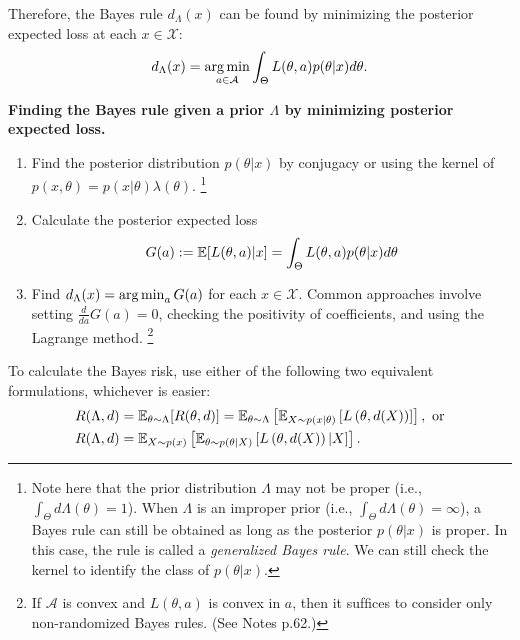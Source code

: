 Therefore, the Bayes rule $d_\Lambda(x)$ can be found by minimizing the posterior expected loss at each $x \in \mathcal{X}$:
\[
d_\Lambda(x) = \operatorname*{arg\,min}_{a \in \mathcal{A}} \int_\Theta L(\theta, a) p(\theta|x) d\theta.
\]

\begin{mybox}
    \textbf{Finding the Bayes rule given a prior $\Lambda$ by minimizing posterior expected loss.}
    \begin{enumerate}[leftmargin=36pt]
        \item[Step 1:] Find the posterior distribution $p(\theta|x)$ by conjugacy or using the kernel of $p(x,\theta) = p(x|\theta)\lambda(\theta)$.
        \footnote{Note here that the prior distribution $\Lambda$ may not be proper (i.e., $\int_\Theta d\Lambda(\theta)=1$). When $\Lambda$ is an improper prior (i.e., $\int_\Theta d\Lambda(\theta)=\infty$), a Bayes rule can still be obtained as long as the posterior $p(\theta|x)$ is proper. In this case, the rule is called a \emph{generalized Bayes rule}. We can still check the kernel to identify the class of $p(\theta|x)$.}
        \item[Step 2:] Calculate the posterior expected loss 
        \[
        G(a) :=\mathbb{E}[L(\theta, a)|x] = \int_\Theta L(\theta, a) p(\theta|x) d\theta
        \]
        \item[Step 3:] Find $d_\Lambda(x) = \operatorname*{arg\,min}_{a} G(a)$ for each $x \in \mathcal{X}$. Common approaches involve setting $\frac{d}{da} G(a) = 0$, checking the positivity of coefficients, and using the Lagrange method.
        \footnote{
            If $\mathcal A$ is convex and $L(\theta,a)$ is convex in $a$, then it sufﬁces to consider only non-randomized Bayes rules. (See Notes p.62.)
        }
    \end{enumerate}

    To calculate the Bayes risk, use either of the following two equivalent formulations, whichever is easier:
    \begin{align*}
        R(\Lambda,d)
        &= \mathbb{E}_{\theta\sim\Lambda}[R(\theta,d)]
        = \mathbb{E}_{\theta\sim\Lambda}\left[
        \mathbb{E}_{X\sim p(x | \theta)}
        \left[L\left(\theta,d(X)\right)\right]
        \right],\ \text{or}\\
        R(\Lambda,d)
        &= \mathbb{E}_{X\sim p(x)}\left[
        \mathbb{E}_{\theta\sim p(\theta | X)}
        \left[L\left(\theta,d(X)\right) | X\right]
        \right].
    \end{align*}
\end{mybox}

